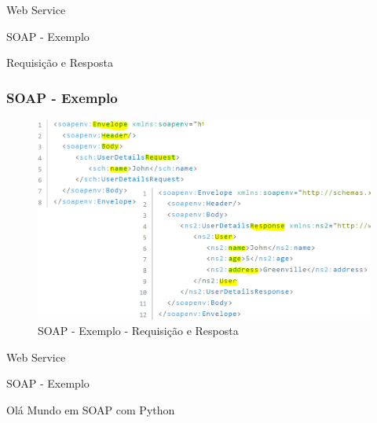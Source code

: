 \documentclass[
	10pt, %
	t, %
]{beamer}
\begin{document}
\begin{frame}
	\begin{center}
		
		\bigskip\bigskip\bigskip\bigskip %
		{\Large Web Service}
		
		\bigskip\bigskip %
		{\Huge SOAP - Exemplo}
		
		\smallskip
		{\small Requisição e Resposta} 
	\end{center}

\end{frame}

\begin{frame}
	\frametitle{SOAP - Exemplo}
	
	\begin{figure}
		\includegraphics[width=0.8\linewidth]{soap_example_user.png}
		\caption{SOAP - Exemplo - Requisição e Resposta}
		\label{fig:soap_example_user}
	\end{figure}

\end{frame}

\begin{frame}
	\begin{center}
		
		\bigskip\bigskip\bigskip\bigskip %
		{\Large Web Service}
		
		\bigskip\bigskip %
		{\Huge SOAP - Exemplo}
		
		\smallskip
		{\small Olá Mundo em SOAP com Python} 
	\end{center}

\end{frame}
\end{document}
